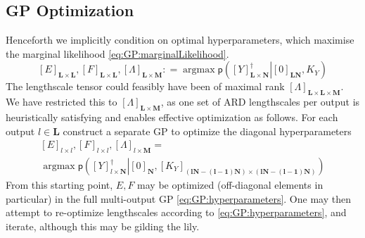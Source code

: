 \documentclass[preprint,12pt]{elsarticle}
\newcommand*{\M}[1]{\ensuremath{#1}\xspace}
\newcommand*{\x}{\times}
\newcommand*{\mi}[1]{\mathbf{#1}}
\newcommand*{\te}[2][]{\left\lbrack{#2}\right\rbrack_{#1}}
\newcommand*{\prob}[3]{\M{\mathsf{p}\!\left(\left.{#1}\right\vert{#2,#3}\right)}}
\newcommand*{\deq}{\M{\mathrel{\mathop:}=}}
\DeclareMathOperator*{\argmax}{argmax}
\begin{document}
    \subsection{GP Optimization} \label{sub:GP:Optimization}
        Henceforth we implicitly condition on optimal hyperparameters, which maximise the marginal likelihood \cref{eq:GP:marginalLikelihood}.
        \begin{equation} \label{eq:GP:hyperparameters}
            \te[\mi{L}\x\mi{L}]{E},\te[\mi{L}\x\mi{L}]{F},\te[\mi{L}\x\mi{M}]{\Lambda} \deq \argmax \prob{\te[\mi{L\x N}]{Y}^{\dagger}}{\te[\mi{LN}]{0}}{K_Y}
        \end{equation}
        The lengthscale tensor could feasibly have been of maximal rank $\te[\mi{L}\x\mi{L}\x\mi{M}]{\Lambda}$. We have restricted this to $\te[\mi{L}\x\mi{M}]{\Lambda}$, as one set of ARD lengthscales per output is heuristically satisfying and enables effective optimization as follows.
        For each output $l \in \mi{L}$ construct a separate GP to optimize the diagonal hyperparameters
        \begin{multline*}
            \te[l\x l]{E},\te[l\x l]{F},\te[l\x\mi{M}]{\Lambda} = \\
            \argmax \prob{\te[l\x \mi{N}]{Y}^{\dagger}}{\te[\mi{N}]{0}}{\te[(\mi{lN-(l-1)N})\x (\mi{lN-(l-1)N})]{K_Y}}
        \end{multline*}
        From this starting point, $E,F$ may be optimized (off-diagonal elements in particular) in the full multi-output GP \cref{eq:GP:hyperparameters}. One may then attempt to re-optimize lengthscales according to \cref{eq:GP:hyperparameters}, and iterate, although this may be gilding the lily.
\end{document}
